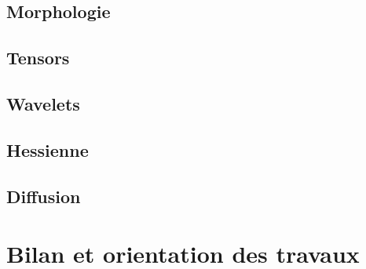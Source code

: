 \subsection{Morphologie}
\label{sec:EA:rehaussement:morpho}

\subsection{Tensors}
\label{sec:EA:rehaussement:tensors}


\subsection{Wavelets}
\label{sec:EA:rehaussement:wavelets}


\subsection{Hessienne}
\label{sec:EA:rehaussement:hessienne}


\subsection{Diffusion}
\label{sec:EA:rehaussement:diffusion}


\section{Bilan et orientation des travaux}
\label{sec:EA:bilan}



